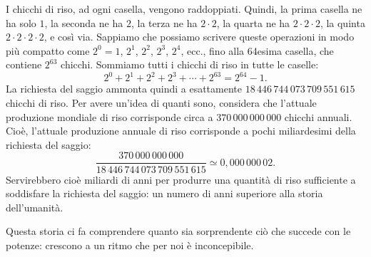\documentclass[11pt]{report}
\begin{document}
I chicchi di riso, ad ogni casella, vengono raddoppiati. Quindi, la prima casella ne ha solo $1$, la seconda ne ha $2$, la terza ne ha $2\cdot 2$, la quarta ne ha $2\cdot 2 \cdot 2$, la quinta $2\cdot 2 \cdot 2 \cdot 2$, e così via. Sappiamo che possiamo scrivere queste operazioni in modo più compatto come $2^0=1$, $2^1$, $2^2$, $2^3$, $2^4$, ecc., fino alla 64esima casella, che contiene $2^{63}$ chicchi. Sommiamo tutti i chicchi di riso in tutte le caselle:
\[
2^0+2^1+2^2+2^3+\cdots+2^{63} = 2^{64}-1 .
\]
La richiesta del saggio ammonta quindi a esattamente $18\,446\,744\,073\,709\,551\,615$ chicchi di riso. Per avere un'idea di quanti sono, considera che l'attuale produzione mondiale di riso corrisponde circa a $370\,000\,000\,000$ chicchi annuali. Cioè, l'attuale produzione annuale di riso corrisponde a pochi miliardesimi della richiesta del saggio:
\[
\frac{370\,000\,000\,000}{18\,446\,744\,073\,709\,551\,615} \simeq 0{,}000\,000\,02 .
\]
Servirebbero cioè miliardi di anni per produrre una quantità di riso sufficiente a soddisfare la richiesta del saggio: un numero di anni superiore alla storia dell'umanità.

Questa storia ci fa comprendere quanto sia sorprendente ciò che succede con le potenze: crescono a un ritmo che per noi è inconcepibile.
\end{document}
